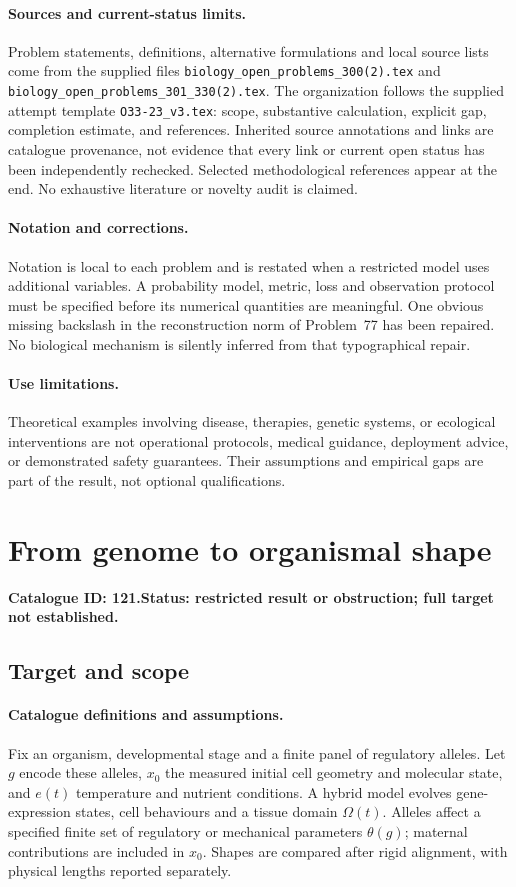 \documentclass[11pt]{article}
\begin{document}
\paragraph{Sources and current-status limits.}
Problem statements, definitions, alternative formulations and local source lists
come from the supplied files
\texttt{biology\_open\_problems\_300(2).tex} and
\texttt{biology\_open\_problems\_301\_330(2).tex}.
The organization follows the supplied attempt template
\texttt{O33-23\_v3.tex}: scope, substantive calculation, explicit gap,
completion estimate, and references. Inherited source annotations and links are
catalogue provenance, not evidence that every link or current open status has
been independently rechecked. Selected methodological references appear at the
end. No exhaustive literature or novelty audit is claimed.

\paragraph{Notation and corrections.}
Notation is local to each problem and is restated when a restricted model uses
additional variables. A probability model, metric, loss and observation protocol
must be specified before its numerical quantities are meaningful. One obvious
missing backslash in the reconstruction norm of Problem~77 has been repaired.
No biological mechanism is silently inferred from that typographical repair.

\paragraph{Use limitations.}
Theoretical examples involving disease, therapies, genetic systems, or ecological
interventions are not operational protocols, medical guidance, deployment advice,
or demonstrated safety guarantees. Their assumptions and empirical gaps are part
of the result, not optional qualifications.

\setcounter{section}{120}
\section{From genome to organismal shape}
\label{prob:121}
\noindent\textbf{Catalogue ID: 121.}\quad \textbf{Status: restricted result or obstruction; full target not established.}
\subsection{Target and scope}
\paragraph{Catalogue definitions and assumptions.}
Fix an organism, developmental stage and a finite panel of regulatory alleles. Let $g$ encode these alleles, $x_0$ the measured initial cell geometry and molecular state, and $e(t)$ temperature and nutrient conditions. A hybrid model evolves gene-expression states, cell behaviours and a tissue domain $\Omega(t)$. Alleles affect a specified finite set of regulatory or mechanical parameters $\theta(g)$; maternal contributions are included in $x_0$. Shapes are compared after rigid alignment, with physical lengths reported separately.
\end{document}
